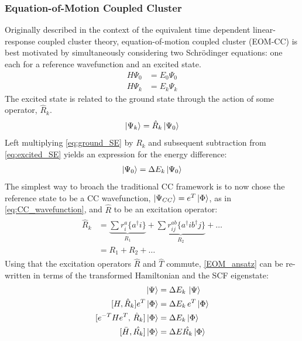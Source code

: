 \subsubsection{Equation-of-Motion Coupled Cluster}
Originally described in the context of the equivalent time dependent linear-response coupled cluster theory, equation-of-motion coupled cluster (EOM-CC) is best motivated by simultaneously considering two Schr\"odinger equations: one each for a reference wavefunction and an excited state. 
\begin{align}
H \Psi_0 &= E_0 \Psi_0 \label{eq:ground_SE}\\
H \Psi_k &= E_k \Psi_k \label{eq:excited_SE}
\end{align}
The excited state is related to the ground state through the action of some operator, $\hat{R}_k$.
\begin{equation}
\ket{\Psi_{k}} = \hat{R}_k \ket{\Psi_{0}} \label{eq:EOM_excited_state}
\end{equation}
Left multiplying \cref{eq:ground_SE} by $R_k$ and subsequent subtraction from \cref{eq:excited_SE} yields an expression for the energy difference: 
\begin{align}
[H,\hat{R}_k] \ket{\Psi_{0}}  = \Delta E_k \ket{\Psi_{0}} \label{EOM_ansatz}
\end{align}
The simplest way to broach the traditional CC framework is to now chose the reference state to be a CC wavefunction, $\ket{\Psi_{CC}} = e^T \ket{\Phi}$, as in  \cref{eq:CC_wavefunction}, and $\hat{R}$ to be an excitation operator:
\begin{align}
\begin{split}
\hat{R}_k &= \underbrace{\sum r^a_i \{a^\dag i\}}_{R_1} + \underbrace{\sum r^{ab}_{ij} \{a^\dag i b^\dag j\}}_{R_2}+ \dots \\
&=  R_1 + R_2 + \dots \label{eq:R_K}
\end{split}
\end{align}
Using that the excitation operators $\hat{R}$ and $\hat{T}$ commute, \cref{EOM_ansatz} can be re-written in terms of the transformed Hamiltonian and the SCF eigenstate: 
\begin{align}
[H,\hat{R}_k] \ket{\Psi} &= \Delta E_k \, \ket{\Psi} \label{eq:EOM_transformed_basis} \\
[H,\hat{R}_k] e^T \ket{\Phi} &= \Delta E_k \, e^T \ket{\Phi}\notag  \\
[ e^{-T} H e^T, \,\hat{R}_k] \ket{\Phi} &= \Delta E_k \ket{\Phi} \notag\\
[\bar{H}, \hat{R_k}] \ket{\Phi} &= \Delta{E} \hat{R_k} \ket{\Phi} \label{eq:EOM_transformed_hamiltonian} 
\end{align} 

